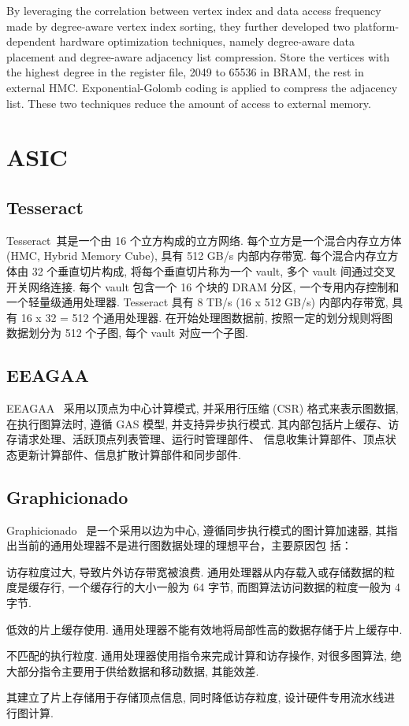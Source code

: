 \documentclass[UTF8,12pt,a4paper]{article}
\begin{document}
By leveraging the correlation between vertex index and data access frequency
made by degree-aware vertex index sorting,
they further developed two platform-dependent hardware optimization techniques,
namely degree-aware data placement and degree-aware adjacency list compression.
Store the vertices with the highest degree in the register file,
2049 to 65536 in BRAM, the rest in external HMC.
Exponential-Golomb coding is applied to compress the adjacency list.
These two techniques reduce the amount of access to external memory.

\clearpage

\section{ASIC}
\subsection{Tesseract}
Tesseract~\cite{DBLP:conf/isca/AhnHYMC15}其是一个由 16 个立方构成的立方网络.
每个立方是一个混合内存立方体(HMC, Hybrid Memory Cube), 具有 512 GB/s 内部内存带宽.
每个混合内存立方体由 32 个垂直切片构成, 将每个垂直切片称为一个 vault, 多个 vault 间通过交叉开关网络连接.
每个 vault 包含一个 16 个块的 DRAM 分区, 一个专用内存控制和一个轻量级通用处理器.
Tesseract 具有 8 TB/s (16 x 512 GB/s) 内部内存带宽, 具有 16 x 32 = 512 个通用处理器.
在开始处理图数据前, 按照一定的划分规则将图数据划分为 512 个子图, 每个 vault 对应一个子图.

\subsection{EEAGAA}
EEAGAA~\cite{DBLP:conf/isca/OzdalYKAGBO16} 采用以顶点为中心计算模式,
并采用行压缩 (CSR) 格式来表示图数据, 在执行图算法时, 遵循 GAS 模型, 并支持异步执行模式.
其内部包括片上缓存、访存请求处理、活跃顶点列表管理、运行时管理部件、
信息收集计算部件、顶点状态更新计算部件、信息扩散计算部件和同步部件.

\subsection{Graphicionado}
Graphicionado~\cite{DBLP:conf/micro/HamWSSM16}
是一个采用以边为中心, 遵循同步执行模式的图计算加速器,
其指出当前的通用处理器不是进行图数据处理的理想平台，主要原因包
括：
\begin{compactitem}
  \item 访存粒度过大, 导致片外访存带宽被浪费.
  通用处理器从内存载入或存储数据的粒度是缓存行,
  一个缓存行的大小一般为 64 字节, 而图算法访问数据的粒度一般为 4 字节.
  \item 低效的片上缓存使用. 通用处理器不能有效地将局部性高的数据存储于片上缓存中.
  \item 不匹配的执行粒度. 通用处理器使用指令来完成计算和访存操作,
  对很多图算法, 绝大部分指令主要用于供给数据和移动数据, 其能效差.
\end{compactitem}
其建立了片上存储用于存储顶点信息, 同时降低访存粒度, 设计硬件专用流水线进行图计算.
\end{document}
